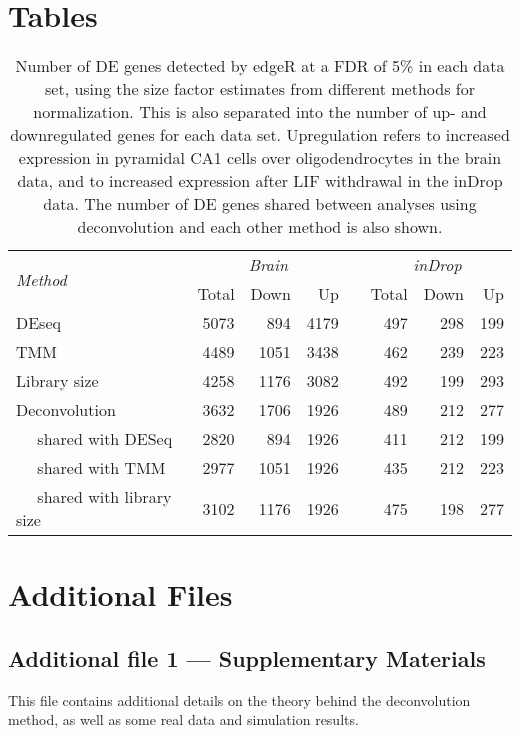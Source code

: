 \documentclass{bmcart}
\begin{document}
\begin{backmatter}

\section*{Tables}

\begin{table}[bt]
\caption{
    Number of DE genes detected by edgeR at a FDR of 5\% in each data set, using the size factor estimates from different methods for normalization.
    This is also separated into the number of up- and downregulated genes for each data set.
    Upregulation refers to increased expression in pyramidal CA1 cells over oligodendrocytes in the brain data, and to increased expression after LIF withdrawal in the inDrop data.
    The number of DE genes shared between analyses using deconvolution and each other method is also shown.
}
\begin{center}
\begin{tabular}{l r r r c r r r}
\hline
\multirow{2}{*}{\textit{Method}} & \multicolumn{3}{c}{\textit{Brain}} && \multicolumn{3}{c}{\textit{inDrop}}  \\
\cline{2-4}
\cline{6-8}
& Total & Down & Up && Total & Down & Up \\
\hline
DEseq                               & 5073 & 894  & 4179 && 497 & 298 & 199 \\
TMM                                 & 4489 & 1051 & 3438 && 462 & 239 & 223 \\
Library size                        & 4258 & 1176 & 3082 && 492 & 199 & 293 \\
Deconvolution                       & 3632 & 1706 & 1926 && 489 & 212 & 277 \\
$\quad$ shared with DESeq           & 2820 & 894  & 1926 && 411 & 212 & 199 \\
$\quad$ shared with TMM             & 2977 & 1051 & 1926 && 435 & 212 & 223 \\
$\quad$ shared with library size    & 3102 & 1176 & 1926 && 475 & 198 & 277 \\
\hline                                                   
\end{tabular}
\end{center}
\label{tab:real_de}
\end{table}


\section*{Additional Files}
\subsection*{Additional file 1 --- Supplementary Materials}
This file contains additional details on the theory behind the deconvolution method, as well as some real data and simulation results.

\end{backmatter}
\end{document}
